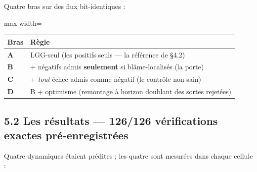 \documentclass[11pt]{article}
\begin{document}
Quatre bras sur des flux bit-identiques :

\begin{center}\small\begin{adjustbox}{max width=\linewidth}\begin{tabular}{ll}\toprule
Bras & Règle \\ \midrule
\textbf{A} & LGG-seul (les positifs seuls — la référence de §4.2) \\
\textbf{B} & + négatifs admis \textbf{seulement} si blâme-localisés (la porte) \\
\textbf{C} & + \emph{tout} échec admis comme négatif (le contrôle non-sain) \\
\textbf{D} & B + optimisme (remontage à horizon doublant des sortes rejetées) \\
\bottomrule\end{tabular}\end{adjustbox}\end{center}

\subsection*{5.2 Les résultats — 126/126 vérifications exactes pré-enregistrées}

Quatre dynamiques étaient prédites ; les quatre sont mesurées dans chaque cellule :
\end{document}
